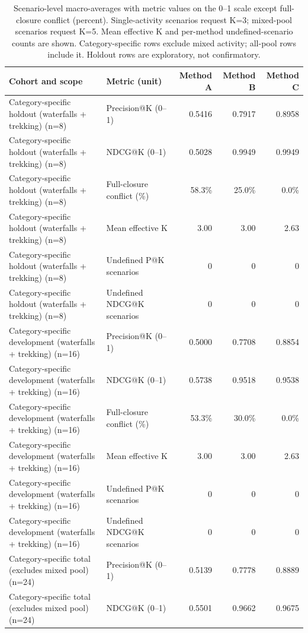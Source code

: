 \begin{table}[t]
\centering
\caption{Scenario-level macro-averages with metric values on the 0--1 scale except full-closure conflict (percent). Single-activity scenarios request K=3; mixed-pool scenarios request K=5. Mean effective K and per-method undefined-scenario counts are shown. Category-specific rows exclude mixed activity; all-pool rows include it. Holdout rows are exploratory, not confirmatory.}
\begin{tabular}{llrrr}
\toprule Cohort and scope & Metric (unit) & Method A & Method B & Method C \\ \midrule
Category-specific holdout (waterfalls + trekking) (n=8) & Precision@K (0--1) & 0.5416 & 0.7917 & 0.8958 \\
Category-specific holdout (waterfalls + trekking) (n=8) & NDCG@K (0--1) & 0.5028 & 0.9949 & 0.9949 \\
Category-specific holdout (waterfalls + trekking) (n=8) & Full-closure conflict (\%) & 58.3\% & 25.0\% & 0.0\% \\
Category-specific holdout (waterfalls + trekking) (n=8) & Mean effective K & 3.00 & 3.00 & 2.63 \\
Category-specific holdout (waterfalls + trekking) (n=8) & Undefined P@K scenarios & 0 & 0 & 0 \\
Category-specific holdout (waterfalls + trekking) (n=8) & Undefined NDCG@K scenarios & 0 & 0 & 0 \\
Category-specific development (waterfalls + trekking) (n=16) & Precision@K (0--1) & 0.5000 & 0.7708 & 0.8854 \\
Category-specific development (waterfalls + trekking) (n=16) & NDCG@K (0--1) & 0.5738 & 0.9518 & 0.9538 \\
Category-specific development (waterfalls + trekking) (n=16) & Full-closure conflict (\%) & 53.3\% & 30.0\% & 0.0\% \\
Category-specific development (waterfalls + trekking) (n=16) & Mean effective K & 3.00 & 3.00 & 2.63 \\
Category-specific development (waterfalls + trekking) (n=16) & Undefined P@K scenarios & 0 & 0 & 0 \\
Category-specific development (waterfalls + trekking) (n=16) & Undefined NDCG@K scenarios & 0 & 0 & 0 \\
Category-specific total (excludes mixed pool) (n=24) & Precision@K (0--1) & 0.5139 & 0.7778 & 0.8889 \\
Category-specific total (excludes mixed pool) (n=24) & NDCG@K (0--1) & 0.5501 & 0.9662 & 0.9675 \\

\end{tabular}
\end{table}
